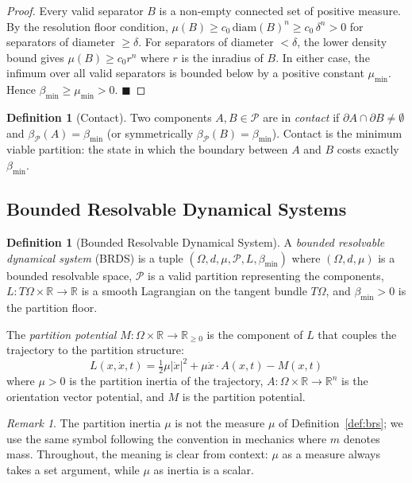 \documentclass[12pt, a4paper]{article}
\theoremstyle{plain}
\theoremstyle{definition}
\newtheorem{definition}[theorem]{Definition}
\theoremstyle{remark}
\newtheorem{remark}[theorem]{Remark}
\newcommand{\bmin}{\beta_{\min}}
\newcommand{\reals}{\mathbb{R}}
\newcommand{\mumin}{\mu_{\min}}
\newcommand{\Pcal}{\mathcal{P}}
\newcommand{\half}{\tfrac{1}{2}}
\newcommand{\qed}{\hfill$\blacksquare$}
\begin{document}
\begin{proof}
Every valid separator $B$ is a non-empty connected set of positive measure.
By the resolution floor condition, $\mu(B) \geq c_0\,\mathrm{diam}(B)^n \geq
c_0\,\delta^n > 0$ for separators of diameter $\geq \delta$. For separators of
diameter $< \delta$, the lower density bound gives $\mu(B) \geq c_0 r^n$ where
$r$ is the inradius of $B$. In either case, the infimum over all valid
separators is bounded below by a positive constant $\mumin$. Hence $\bmin \geq
\mumin > 0$. \qed
\end{proof}

\begin{definition}[Contact]
\label{def:contact}
Two components $A, B \in \Pcal$ are in \emph{contact} if $\partial A \cap
\partial B \neq \emptyset$ and $\beta_\Pcal(A) = \bmin$ (or symmetrically
$\beta_\Pcal(B) = \bmin$). Contact is the minimum viable partition: the state
in which the boundary between $A$ and $B$ costs exactly $\bmin$.
\end{definition}

\subsection{Bounded Resolvable Dynamical Systems}

\begin{definition}[Bounded Resolvable Dynamical System]
\label{def:brds}
A \emph{bounded resolvable dynamical system} (BRDS) is a tuple
$(\Omega, d, \mu, \Pcal, L, \bmin)$ where $(\Omega, d, \mu)$ is a bounded
resolvable space, $\Pcal$ is a valid partition representing the components,
$L: T\Omega \times \reals \to \reals$ is a smooth Lagrangian on the tangent
bundle $T\Omega$, and $\bmin > 0$ is the partition floor.

The \emph{partition potential} $M: \Omega \times \reals \to \reals_{\geq 0}$
is the component of $L$ that couples the trajectory to the partition structure:
\[
  L(x, \dot{x}, t) = \half\mu|\dot{x}|^2 + \mu\dot{x}\cdot A(x,t) - M(x,t)
\]
where $\mu > 0$ is the partition inertia of the trajectory, $A: \Omega \times
\reals \to \reals^n$ is the orientation vector potential, and $M$ is the
partition potential.
\end{definition}

\begin{remark}
The partition inertia $\mu$ is not the measure $\mu$ of Definition~\ref{def:brs};
we use the same symbol following the convention in mechanics where $m$ denotes
mass. Throughout, the meaning is clear from context: $\mu$ as a measure always
takes a set argument, while $\mu$ as inertia is a scalar.
\end{remark}
\end{document}
